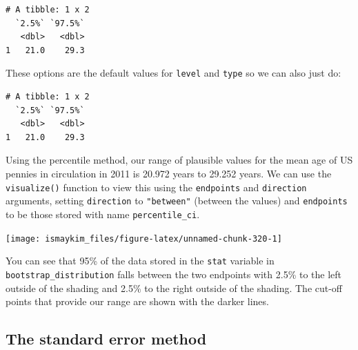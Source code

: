 \documentclass[12pt,]{krantz}
\makeatletter
\newenvironment{Shaded}{\begin{snugshade}}{\end{snugshade}}
\newcommand{\KeywordTok}[1]{\textcolor[rgb]{0.27,0.27,0.27}{\textbf{#1}}}
\newcommand{\DataTypeTok}[1]{\textcolor[rgb]{0.27,0.27,0.27}{#1}}
\newcommand{\StringTok}[1]{\textcolor[rgb]{0.5,0.5,0.5}{#1}}
\newcommand{\OperatorTok}[1]{\textcolor[rgb]{0.43,0.43,0.43}{\textbf{#1}}}
\newcommand{\NormalTok}[1]{#1}
\newenvironment{kframe}{%
\medskip{}
\setlength{\fboxsep}{.8em}
 \def\at@end@of@kframe{}%
 \ifinner\ifhmode%
  \def\at@end@of@kframe{\end{minipage}}%
  \begin{minipage}{\columnwidth}%
 \fi\fi%
 \def\FrameCommand##1{\hskip\@totalleftmargin \hskip-\fboxsep
 \colorbox{shadecolor}{##1}\hskip-\fboxsep
     \hskip-\linewidth \hskip-\@totalleftmargin \hskip\columnwidth}%
 \MakeFramed {\advance\hsize-\width
   \@totalleftmargin\z@ \linewidth\hsize
   \@setminipage}}%
 {\par\unskip\endMakeFramed%
 \at@end@of@kframe}
\renewenvironment{Shaded}{\begin{kframe}}{\end{kframe}}
\theoremstyle{definition}
\theoremstyle{definition}
\theoremstyle{definition}
\theoremstyle{remark}
\makeatother
\begin{document}
\begin{verbatim}
# A tibble: 1 x 2
  `2.5%` `97.5%`
   <dbl>   <dbl>
1   21.0    29.3
\end{verbatim}

These options are the default values for \texttt{level} and
\texttt{type} so we can also just do:

\begin{Shaded}
\end{Shaded}

\begin{verbatim}
# A tibble: 1 x 2
  `2.5%` `97.5%`
   <dbl>   <dbl>
1   21.0    29.3
\end{verbatim}

Using the percentile method, our range of plausible values for the mean
age of US pennies in circulation in 2011 is 20.972 years to 29.252
years. We can use the \texttt{visualize()} function to view this using
the \texttt{endpoints} and \texttt{direction} arguments, setting
\texttt{direction} to \texttt{"between"} (between the values) and
\texttt{endpoints} to be those stored with name \texttt{percentile\_ci}.

\begin{Shaded}
\end{Shaded}

\begin{center}\texttt{[image: ismaykim\_files/figure-latex/unnamed-chunk-320-1]} \end{center}

You can see that 95\% of the data stored in the \texttt{stat} variable
in \texttt{bootstrap\_distribution} falls between the two endpoints with
2.5\% to the left outside of the shading and 2.5\% to the right outside
of the shading. The cut-off points that provide our range are shown with
the darker lines.

\subsection{The standard error method}\label{the-standard-error-method}
\end{document}

